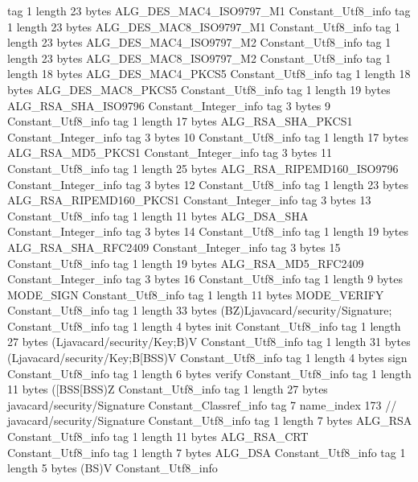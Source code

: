 {{{			tag	1
			length	23
			bytes	ALG_DES_MAC4_ISO9797_M1
		}
		Constant_Utf8_info {
			tag	1
			length	23
			bytes	ALG_DES_MAC8_ISO9797_M1
		}
		Constant_Utf8_info {
			tag	1
			length	23
			bytes	ALG_DES_MAC4_ISO9797_M2
		}
		Constant_Utf8_info {
			tag	1
			length	23
			bytes	ALG_DES_MAC8_ISO9797_M2
		}
		Constant_Utf8_info {
			tag	1
			length	18
			bytes	ALG_DES_MAC4_PKCS5
		}
		Constant_Utf8_info {
			tag	1
			length	18
			bytes	ALG_DES_MAC8_PKCS5
		}
		Constant_Utf8_info {
			tag	1
			length	19
			bytes	ALG_RSA_SHA_ISO9796
		}
		Constant_Integer_info {
			tag	3
			bytes	9
		}
		Constant_Utf8_info {
			tag	1
			length	17
			bytes	ALG_RSA_SHA_PKCS1
		}
		Constant_Integer_info {
			tag	3
			bytes	10
		}
		Constant_Utf8_info {
			tag	1
			length	17
			bytes	ALG_RSA_MD5_PKCS1
		}
		Constant_Integer_info {
			tag	3
			bytes	11
		}
		Constant_Utf8_info {
			tag	1
			length	25
			bytes	ALG_RSA_RIPEMD160_ISO9796
		}
		Constant_Integer_info {
			tag	3
			bytes	12
		}
		Constant_Utf8_info {
			tag	1
			length	23
			bytes	ALG_RSA_RIPEMD160_PKCS1
		}
		Constant_Integer_info {
			tag	3
			bytes	13
		}
		Constant_Utf8_info {
			tag	1
			length	11
			bytes	ALG_DSA_SHA
		}
		Constant_Integer_info {
			tag	3
			bytes	14
		}
		Constant_Utf8_info {
			tag	1
			length	19
			bytes	ALG_RSA_SHA_RFC2409
		}
		Constant_Integer_info {
			tag	3
			bytes	15
		}
		Constant_Utf8_info {
			tag	1
			length	19
			bytes	ALG_RSA_MD5_RFC2409
		}
		Constant_Integer_info {
			tag	3
			bytes	16
		}
		Constant_Utf8_info {
			tag	1
			length	9
			bytes	MODE_SIGN
		}
		Constant_Utf8_info {
			tag	1
			length	11
			bytes	MODE_VERIFY
		}
		Constant_Utf8_info {
			tag	1
			length	33
			bytes	(BZ)Ljavacard/security/Signature;
		}
		Constant_Utf8_info {
			tag	1
			length	4
			bytes	init
		}
		Constant_Utf8_info {
			tag	1
			length	27
			bytes	(Ljavacard/security/Key;B)V
		}
		Constant_Utf8_info {
			tag	1
			length	31
			bytes	(Ljavacard/security/Key;B[BSS)V
		}
		Constant_Utf8_info {
			tag	1
			length	4
			bytes	sign
		}
		Constant_Utf8_info {
			tag	1
			length	6
			bytes	verify
		}
		Constant_Utf8_info {
			tag	1
			length	11
			bytes	([BSS[BSS)Z
		}
		Constant_Utf8_info {
			tag	1
			length	27
			bytes	javacard/security/Signature
		}
		Constant_Classref_info {
			tag	7
			name_index	173		// javacard/security/Signature
		}
		Constant_Utf8_info {
			tag	1
			length	7
			bytes	ALG_RSA
		}
		Constant_Utf8_info {
			tag	1
			length	11
			bytes	ALG_RSA_CRT
		}
		Constant_Utf8_info {
			tag	1
			length	7
			bytes	ALG_DSA
		}
		Constant_Utf8_info {
			tag	1
			length	5
			bytes	(BS)V
		}
		Constant_Utf8_info {
}}}
